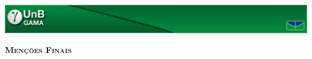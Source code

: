 \documentclass[12pt]{article}
\begin{document}
\begin{center}
    \includegraphics[width=\textwidth]{.latex/logo_fga.pdf}
\end{center}



\begin{huge}
    \begin{center}
        \textbf{\textsc{Menções Finais}}
    \end{center}
\end{huge}


\end{document}
